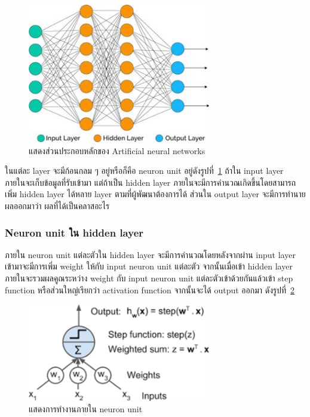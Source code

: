 \documentclass[12pt,oneside,openright,a4paper]{cpe-thai-project}
\begin{document}
\begin{figure}[!h]
  \centering
  \includegraphics[width=8cm]{./image/unit2.jpg}
  \caption{แสดงส่วนประกอบหลักของ Artificial neural networks}
  \label{fig:modelann}
\end{figure}

\par\setlength{\parindent}{5ex}
ในแต่ละ layer จะมีก้อนกลม ๆ อยู่หรือก็คือ neuron unit อยู่ดังรูปที่~\ref{fig:modelann} ถ้าใน input layer ภายในจะเก็บข้อมูลที่รับเข้ามา แต่ถ้าเป็น hidden layer ภายในจะมีการคำนวณเกิดขึ้นโดยสามารถเพิ่ม hidden layer ได้หลาย layer ตามที่ผู้พัฒนาต้องการได้ ส่วนใน output layer จะมีการทำนายผลออกมาว่า ผลที่ได้เป็นคลาสอะไร


\subsubsection{Neuron unit ใน hidden layer}
\par\setlength{\parindent}{5ex}
ภายใน neuron unit แต่ละตัวใน hidden layer จะมีการคำนวณโดยหลังจากผ่าน input layer เข้ามาจะมีการเพิ่ม weight ให้กับ input neuron unit แต่ละตัว จากนั้นเมื่อเข้า hidden layer ภายในจะรวมผลคูณระหว่าง weight กับ input neuron unit แต่ละตัวเข้าด้วยกันแล้วเข้า step function หรือส่วนใหญ่เรียกว่า activation function 
จากนั้นจะได้ output ออกมา ดังรูปที่~\ref{fig:modelNU}

\begin{figure}[!h]
  \centering
  \includegraphics[width=8cm]{./image/neuron_unit.png}
  \caption{แสดงการทำงานภายใน neuron unit \cite{DeepLear55:online}}
  \label{fig:modelNU}
\end{figure}
\end{document}

